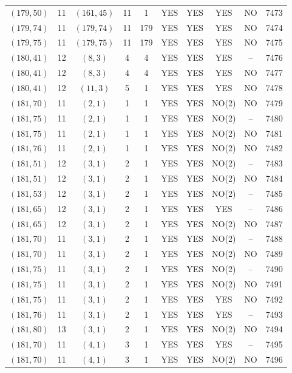 \begin{longtable}{|c|c|c|c|c|c|c|c|c|c|}
$(179, 50)$ & 11 & $(161, 45)$ & 11 & 1 & YES & YES & YES & NO & 7473\\
$(179, 74)$ & 11 & $(179, 74)$ & 11 & 179 & YES & YES & YES & NO & 7474\\
$(179, 75)$ & 11 & $(179, 75)$ & 11 & 179 & YES & YES & YES & NO & 7475\\
$(180, 41)$ & 12 & $(8, 3)$ & 4 & 4 & YES & YES & YES & -- & 7476\\
$(180, 41)$ & 12 & $(8, 3)$ & 4 & 4 & YES & YES & YES & NO & 7477\\
$(180, 41)$ & 12 & $(11, 3)$ & 5 & 1 & YES & YES & YES & NO & 7478\\
$(181, 70)$ & 11 & $(2, 1)$ & 1 & 1 & YES & YES & NO(2) & NO & 7479\\
$(181, 75)$ & 11 & $(2, 1)$ & 1 & 1 & YES & YES & NO(2) & -- & 7480\\
$(181, 75)$ & 11 & $(2, 1)$ & 1 & 1 & YES & YES & NO(2) & NO & 7481\\
$(181, 76)$ & 11 & $(2, 1)$ & 1 & 1 & YES & YES & NO(2) & NO & 7482\\
$(181, 51)$ & 12 & $(3, 1)$ & 2 & 1 & YES & YES & NO(2) & -- & 7483\\
$(181, 51)$ & 12 & $(3, 1)$ & 2 & 1 & YES & YES & NO(2) & NO & 7484\\
$(181, 53)$ & 12 & $(3, 1)$ & 2 & 1 & YES & YES & NO(2) & -- & 7485\\
$(181, 65)$ & 12 & $(3, 1)$ & 2 & 1 & YES & YES & YES & -- & 7486\\
$(181, 65)$ & 12 & $(3, 1)$ & 2 & 1 & YES & YES & NO(2) & NO & 7487\\
$(181, 70)$ & 11 & $(3, 1)$ & 2 & 1 & YES & YES & NO(2) & -- & 7488\\
$(181, 70)$ & 11 & $(3, 1)$ & 2 & 1 & YES & YES & NO(2) & NO & 7489\\
$(181, 75)$ & 11 & $(3, 1)$ & 2 & 1 & YES & YES & NO(2) & -- & 7490\\
$(181, 75)$ & 11 & $(3, 1)$ & 2 & 1 & YES & YES & NO(2) & NO & 7491\\
$(181, 75)$ & 11 & $(3, 1)$ & 2 & 1 & YES & YES & YES & NO & 7492\\
$(181, 76)$ & 11 & $(3, 1)$ & 2 & 1 & YES & YES & YES & -- & 7493\\
$(181, 80)$ & 13 & $(3, 1)$ & 2 & 1 & YES & YES & NO(2) & NO & 7494\\
$(181, 70)$ & 11 & $(4, 1)$ & 3 & 1 & YES & YES & YES & -- & 7495\\
$(181, 70)$ & 11 & $(4, 1)$ & 3 & 1 & YES & YES & NO(2) & NO & 7496\\

\end{longtable}
